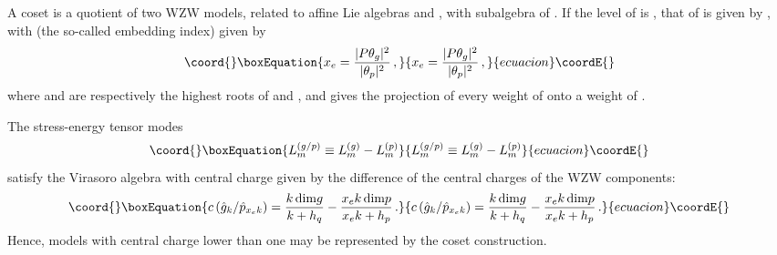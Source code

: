 \documentclass[a4paper,12pt]{report}
\begin{document}
A coset \coordHE{} is a quotient of two WZW models, related to affine Lie algebras \coordHE{} and \coordHE{},
with \coordHE{} subalgebra of \coordHE{}. If the level of \coordHE{} is \coordHE{}, that of \coordHE{} is given by \coordHE{},
with \coordHE{} (the so-called embedding index) given by
\begin{equation}\coord{}\boxEquation{
x_{e}=\frac{|P\theta_{g}|^{2}}{|\theta_{p}|^{2}}\,,
}{
x_{e}=\frac{|P\theta_{g}|^{2}}{|\theta_{p}|^{2}}\,,
}{ecuacion}\coordE{}\end{equation}
where \coordHE{} and \coordHE{} are respectively the highest roots of \coordHE{} and \coordHE{}, and \coordHE{} gives the
projection of every weight of \coordHE{} onto a weight of \coordHE{}.

The stress-energy tensor modes
\begin{equation}\coord{}\boxEquation{
L_{m}^{(g/p)}\equiv L_{m}^{(g)}-L_{m}^{(p)}
}{
L_{m}^{(g/p)}\equiv L_{m}^{(g)}-L_{m}^{(p)}
}{ecuacion}\coordE{}\end{equation}
satisfy the Virasoro algebra with central charge given by the difference of the central charges of the WZW
components:
\begin{equation}\coord{}\boxEquation{
c\left(\hat{g}_{k}/\hat{p}_{x_{e}k}\right)=\frac{k\,\textrm{dim}g}{k+h_{q}}-\frac{x_{e}k\,\textrm{dim}p}{x_{e}k+h_{p}}\,.
}{
c\left(\hat{g}_{k}/\hat{p}_{x_{e}k}\right)=\frac{k\,\textrm{dim}g}{k+h_{q}}-\frac{x_{e}k\,\textrm{dim}p}{x_{e}k+h_{p}}\,.
}{ecuacion}\coordE{}\end{equation}
Hence, models with central charge lower than one may be represented by the coset construction.
\end{document}
